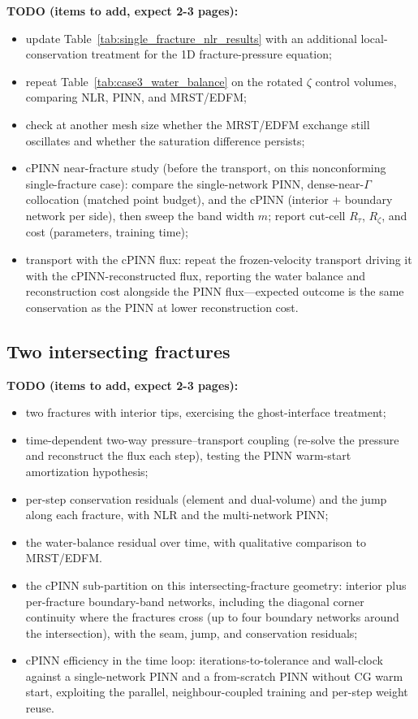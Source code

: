 \documentclass[a4paper,fleqn]{cas-sc}
\begin{document}
{\color{red}
\noindent\textbf{TODO (items to add, expect 2-3 pages):}
\begin{itemize}
\item update Table~\ref{tab:single_fracture_nlr_results} with an additional local-conservation treatment for the 1D fracture-pressure equation;
\item repeat Table~\ref{tab:case3_water_balance} on the rotated \(\zeta\) control volumes, comparing NLR, PINN, and MRST/EDFM;
\item check at another mesh size whether the MRST/EDFM exchange still oscillates and whether the saturation difference persists;
\item cPINN near-fracture study (before the transport, on this nonconforming single-fracture case): compare the single-network PINN, dense-near-\(\Gamma\) collocation (matched point budget), and the cPINN (interior + boundary network per side), then sweep the band width \(m\); report cut-cell \(R_\tau\), \(R_\zeta\), and cost (parameters, training time);
\item transport with the cPINN flux: repeat the frozen-velocity transport driving it with the cPINN-reconstructed flux, reporting the water balance and reconstruction cost alongside the PINN flux---expected outcome is the same conservation as the PINN at lower reconstruction cost.
\end{itemize}
}

\FloatBarrier

\subsection{Two intersecting fractures}
\label{subsec:intersecting-fractures}

{\color{red}
\noindent\textbf{TODO (items to add, expect 2-3 pages):}
\begin{itemize}
\item two fractures with interior tips, exercising the ghost-interface treatment;
\item time-dependent two-way pressure--transport coupling (re-solve the pressure and reconstruct the flux each step), testing the PINN warm-start amortization hypothesis;
\item per-step conservation residuals (element and dual-volume) and the jump along each fracture, with NLR and the multi-network PINN;
\item the water-balance residual over time, with qualitative comparison to MRST/EDFM.
\item the cPINN sub-partition on this intersecting-fracture geometry: interior plus per-fracture boundary-band networks, including the diagonal corner continuity where the fractures cross (up to four boundary networks around the intersection), with the seam, jump, and conservation residuals;
\item cPINN efficiency in the time loop: iterations-to-tolerance and wall-clock against a single-network PINN and a from-scratch PINN without CG warm start, exploiting the parallel, neighbour-coupled training and per-step weight reuse.
\end{itemize}
}
\end{document}
